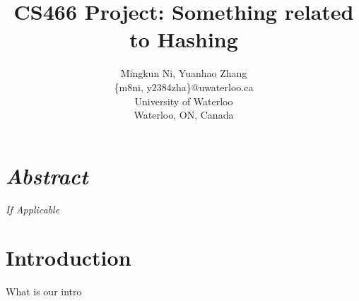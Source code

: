 \documentclass[letterpaper]{article} %
\begin{document}
	\title{CS466 Project: Something related to Hashing}
	\author{Mingkun Ni, Yuanhao Zhang\\
		\{m8ni, y2384zha\}@uwaterloo.ca\\
		University of Waterloo\\
		Waterloo, ON, Canada\\
	}
	\maketitle
	
	
	\section{\em{Abstract}}
	\textit{If Applicable}
	
	\section{Introduction}
	What is our intro
	
\end{document}

